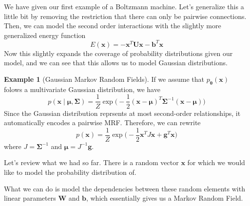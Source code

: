 \documentclass{article}
\theoremstyle{definition}
\newtheorem{example}{Example}[section]
\theoremstyle{remark}
\theoremstyle{definition}
\begin{document}
    We have given our first example of a Boltzmann machine. Let's generalize this a little bit by removing the restriction that there can only be pairwise connections. Then, we can model the second order interactions with the slightly more generalized energy function
      \[E(\mathbf{x}) = -\mathbf{x}^T \mathbf{U} \mathbf{x} - \mathbf{b}^T \mathbf{x}\]
    Now this slightly expands the coverage of probability distributions given our model, and we can see that this allows us to model Gaussian distributions. 

    \begin{example}[Gaussian Markov Random Fields] 
      If we assume that $p_{\boldsymbol{\theta}} ( \mathbf{x})$ folows a multivariate Gaussian distribution, we have 
        \[p(\mathbf{x} \mid \boldsymbol{\mu}, \boldsymbol{\Sigma}) = \frac{1}{Z} \exp \bigg( -\frac{1}{2} (\mathbf{x} - \boldsymbol{\mu})^T \boldsymbol{\Sigma}^{-1} (\mathbf{x} - \boldsymbol{\mu}) \bigg)\]
      Since the Gaussian distribution reprsents at most second-order relationships, it automatically encodes a pairwise MRF. Therefore, we can rewrite 
        \[p(\mathbf{x}) = \frac{1}{Z} \exp \bigg( -\frac{1}{2} \mathbf{x}^T J\mathbf{x} + \mathbf{g}^T \mathbf{x} \bigg)\] 
      where $J = \boldsymbol{\Sigma}^{-1}$ and $\boldsymbol{\mu} = J^{-1} \mathbf{g}$. 
    \end{example}

    Let's review what we had so far. There is a random vector $\mathbf{x}$ for which we would like to model the probability distribution of. 

    \begin{center}
    \end{center}

    What we can do is model the dependencies between these random elements with linear parameters $\mathbf{W}$ and $\mathbf{b}$, which essentially gives us a Markov Random Field.  
\end{document}

